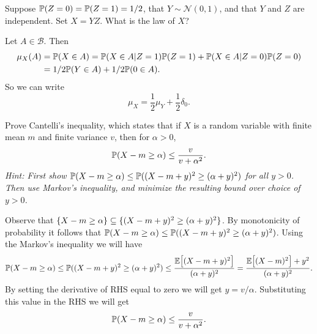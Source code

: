 \begin{problem}
	Suppose $ \mathbb{P}(Z=0)=\mathbb{P}(Z=1) = 1/2 $, that $ Y \sim \mathcal{N}(0,1) $, and that $ Y $ and $ Z $ are independent. Set $ X = YZ $. What is the law of $ X $?
\end{problem}
\begin{solution}
	Let $ A \in \mathcal{B} $. Then 
	\begin{align*}
		\mu_X(A) &= \mathbb{P}(X \in A) = \mathbb{P}(X\in A|Z=1)\mathbb{P}(Z=1) + \mathbb{P}(X\in A|Z=0)\mathbb{P}(Z=0)\\
		&=1/2 \mathbb{P}(Y \in A) + 1/2 \mathbb{P}(0 \in A).
	\end{align*}
	So we can write
	\[ \mu_X = \frac{1}{2} \mu_Y + \frac{1}{2} \delta_0. \]
\end{solution}

\begin{problem}
	Prove Cantelli's inequality, which states that if $ X $ is a random variable with finite mean $ m $ and finite variance $ v $, then for $ \alpha > 0 $,
	\[ \mathbb{P}(X - m \geq \alpha) \leq \frac{v}{v+\alpha^2}. \]
	\emph{Hint: First show $ \mathbb{P}(X-m \geq \alpha) \leq \mathbb{P}((X-m+y)^2\geq (\alpha+y)^2)$ for all $ y>0 $. Then use Markov's inequality, and minimize the resulting bound over choice of $ y > 0 $.}
\end{problem}
\begin{solution}
	Observe that $ \{X-m \geq \alpha\}\subseteq \{(X-m+y)^2\geq (\alpha+y)^2\} $. By monotonicity of probability it follows that $ \mathbb{P}(X-m \geq \alpha)\leq \mathbb{P}((X-m+y)^2\geq (\alpha+y)^2) $. Using the Markov's inequality we will have
	\[  \mathbb{P}(X-m \geq \alpha)\leq \mathbb{P}((X-m+y)^2\geq (\alpha+y)^2) \leq \frac{\mathbb{E}\big[(X-m+y)^2\big]}{(\alpha+y)^2} = \frac{\mathbb{E}\big[(X-m)^2\big]+y^2}{(\alpha+y)^2}.  \]
	By setting the derivative of RHS equal to zero we will get $ y = v/\alpha $. Substituting this value in the RHS we will get
	\[ \mathbb{P}(X-m \geq \alpha)\leq  \frac{v}{v+\alpha^2}. \]
\end{solution}



